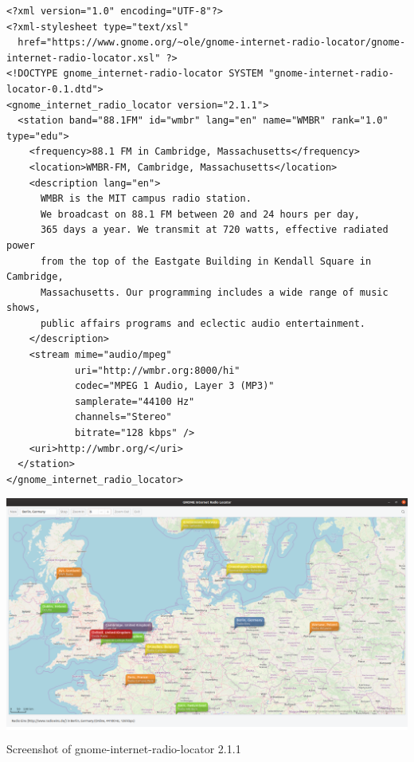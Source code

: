 \documentclass[20pt,landscape]{foils}
\begin{document}
\begin{tiny}
\begin{verbatim}
<?xml version="1.0" encoding="UTF-8"?>
<?xml-stylesheet type="text/xsl"
  href="https://www.gnome.org/~ole/gnome-internet-radio-locator/gnome-internet-radio-locator.xsl" ?>
<!DOCTYPE gnome_internet-radio-locator SYSTEM "gnome-internet-radio-locator-0.1.dtd">
<gnome_internet_radio_locator version="2.1.1">
  <station band="88.1FM" id="wmbr" lang="en" name="WMBR" rank="1.0" type="edu">
    <frequency>88.1 FM in Cambridge, Massachusetts</frequency>
    <location>WMBR-FM, Cambridge, Massachusetts</location>
    <description lang="en">
      WMBR is the MIT campus radio station.
      We broadcast on 88.1 FM between 20 and 24 hours per day, 
      365 days a year. We transmit at 720 watts, effective radiated power 
      from the top of the Eastgate Building in Kendall Square in Cambridge, 
      Massachusetts. Our programming includes a wide range of music shows, 
      public affairs programs and eclectic audio entertainment.
    </description>
    <stream mime="audio/mpeg"
            uri="http://wmbr.org:8000/hi"
            codec="MPEG 1 Audio, Layer 3 (MP3)"
            samplerate="44100 Hz"
            channels="Stereo"
            bitrate="128 kbps" />
    <uri>http://wmbr.org/</uri>
  </station>
</gnome_internet_radio_locator>
\end{verbatim}
\end{tiny}


\begin{center}

  \colorbox{white}{\includegraphics[width=0.6\hsize]{../data/screenshot.png}}

  {\blueem Screenshot of gnome-internet-radio-locator 2.1.1}

\end{center}

\end{document}
